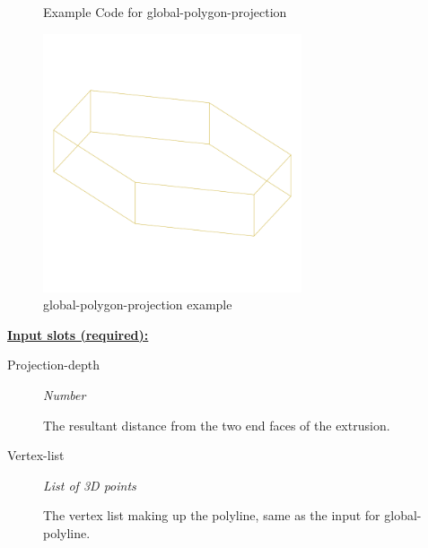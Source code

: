 \documentclass [11pt]{book}
\begin{document}
\begin{itemize}
\begin{figure}
\caption{Example Code for global-polygon-projection}

\label{fig:example-code-global-polygon-projection}

\end{figure}

\begin{figure}
\begin{center}
\includegraphics[width=3in,height=3in]{../images/example-global-polygon-projection.pdf}
\end{center}

\caption{global-polygon-projection example}

\label{fig:global-polygon-projection}

\end{figure}





\textbf{
\underline{Input slots (required):}}

\begin{description}

\item [Projection-depth]
\emph{Number}

 The resultant distance from the two end faces of the extrusion.




\item [Vertex-list]
\emph{List of 3D points}

 The vertex list making up the polyline, same as the input for global-polyline.




\end{description}







\end{itemize}
\end{document}
